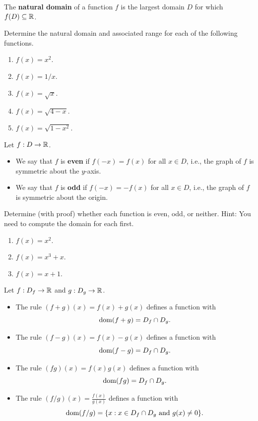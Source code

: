 \newpage

\begin{definition}
The \textbf{natural domain} of a function $f$ is the largest domain $D$ for which $f(D)\subseteq \mathbb R$.
\end{definition}

\begin{example}
Determine the natural domain and associated range for each of the following functions.
\begin{enumerate}
\item $f(x) = x^2$.
\vfill
\item $f(x) = 1/x$.
\vfill
\item $f(x)=\sqrt x$.
\vfill
\item $f(x)=\sqrt{4-x}$.
\vfill
\item $f(x) = \sqrt{1-x^2}$.
\vfill
\end{enumerate}
\end{example}

\newpage

\begin{definition}
Let $f: D\to \mathbb R$.
\begin{itemize}
\item We say that $f$ is \textbf{even} if $f(-x) = f(x)$ for all $x\in D$, i.e., the graph of $f$ is symmetric about the $y$-axis.
\item We say that $f$ is \textbf{odd} if $f(-x) = -f(x)$ for all $x\in D$, i.e., the graph of $f$ is symmetric about the origin.
\end{itemize}
\end{definition}


 \begin{example}
Determine (with proof) whether each function is even, odd, or neither.
Hint: You need to compute the domain for each first.
\begin{enumerate}
\item $f(x) = x^2$.
\vfill
\item $f(x)=x^3+x$.
\vfill
\item $f(x) = x+1$.
\vfill
\end{enumerate}
\end{example}

\newpage

\begin{definition}
Let $f:D_f\to \mathbb R$ and $g:D_g\to \mathbb R$.
\begin{itemize}
\item The rule $(f+g)(x) = f(x) + g(x)$ defines a function with $$\mathrm{dom}(f+g) = D_f\cap D_g.$$
\item The rule $(f-g)(x) = f(x) - g(x)$ defines a function with $$\mathrm{dom}(f-g) = D_f\cap D_g.$$
\item The rule $(fg)(x) = f(x)  g(x)$ defines a function with $$\mathrm{dom}(fg) = D_f\cap D_g.$$
\item The rule $(f/g)(x) = \frac{f(x)}{g(x)}$ defines a function with $$\mathrm{dom}(f/g) = \{x : x\in D_f\cap D_g\text{ and } g(x)\ne 0\}.$$
\end{itemize}
\end{definition}

